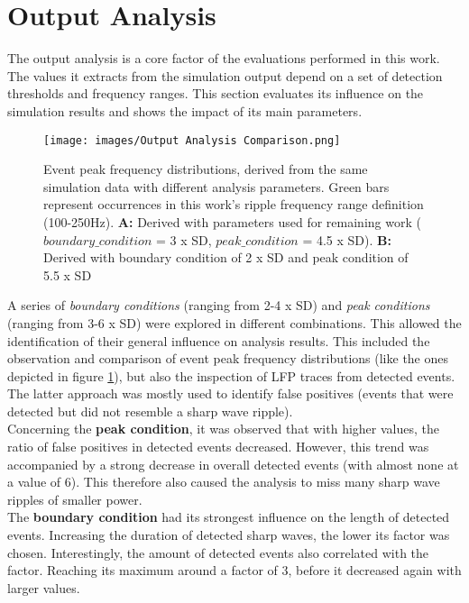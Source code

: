\section{Output Analysis}
The output analysis is a core factor of the evaluations performed in this work. The values it extracts from the simulation output depend on a set of detection thresholds and frequency ranges. This section evaluates its influence on the simulation results and shows the impact of its main parameters.

\begin{figure}[htbp]
    \centering
    \texttt{[image: images/Output Analysis Comparison.png]}
    \caption{Event peak frequency distributions, derived from the same simulation data with different analysis parameters. Green bars represent occurrences in this work's ripple frequency range definition (100-250Hz). \textbf{A:} Derived with parameters used for remaining work (\(boundary\_condition\) = 3 x SD, \(peak\_condition\) = 4.5 x SD). \textbf{B:} Derived with boundary condition of 2 x SD and peak condition of 5.5 x SD}
    \label{fig:output_analysis_comp}
\end{figure}
A series of \textit{boundary conditions} (ranging from 2-4 x SD) and \textit{peak conditions} (ranging from 3-6 x SD) were explored in different combinations. This allowed the identification of their general influence on analysis results. This included the observation and comparison of event peak frequency distributions (like the ones depicted in figure \ref{fig:output_analysis_comp}), but also the inspection of LFP traces from detected events. The latter approach was mostly used to identify false positives (events that were detected but did not resemble a sharp wave ripple).\\
Concerning the \textbf{peak condition}, it was observed that with higher values, the ratio of false positives in detected events decreased. However, this trend was accompanied by a strong decrease in overall detected events (with almost none at a value of 6). This therefore also caused the analysis to miss many sharp wave ripples of smaller power.\\
The \textbf{boundary condition} had its strongest influence on the length of detected events. Increasing the duration of detected sharp waves, the lower its factor was chosen. Interestingly, the amount of detected events also correlated with the factor. Reaching its maximum around a factor of 3, before it decreased again with larger values.

